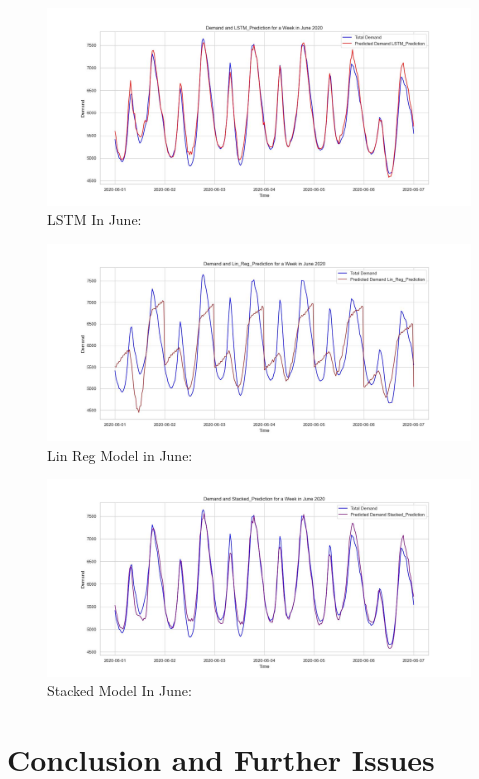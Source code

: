 \documentclass[
]{article}
\begin{document}
\begin{figure}
\centering
\includegraphics{img/lstm-prediction_june_2020.jpg}
\caption{LSTM In June:}
\end{figure}

\begin{figure}
\centering
\includegraphics{img/lin-reg-prediction_june_2020.jpg}
\caption{Lin Reg Model in June:}
\end{figure}

\begin{figure}
\centering
\includegraphics{img/stacked-prediction_june_2020.jpg}
\caption{Stacked Model In June:}
\end{figure}

\section{Conclusion and Further
Issues}\label{conclusion-and-further-issues}
\end{document}
